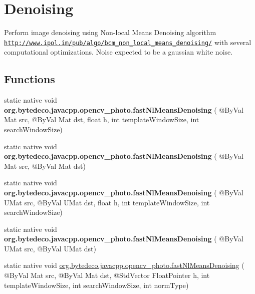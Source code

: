 \hypertarget{group__photo__denoise}{}\section{Denoising}
\label{group__photo__denoise}


Perform image denoising using Non-\/local Means Denoising algorithm \href{http://www.ipol.im/pub/algo/bcm_non_local_means_denoising/}{\tt http\+://www.\+ipol.\+im/pub/algo/bcm\+\_\+non\+\_\+local\+\_\+means\+\_\+denoising/} with several computational optimizations. Noise expected to be a gaussian white noise.  


\subsection*{Functions}
\begin{DoxyCompactItemize}
\item 
\mbox{\label{group__photo__denoise_ga088a2a8638cdda9ef6f168844c3b25af}} 
static native void {\bfseries org.\+bytedeco.\+javacpp.\+opencv\+\_\+photo.\+fast\+Nl\+Means\+Denoising} ( @By\+Val Mat src, @By\+Val Mat dst, float h, int template\+Window\+Size, int search\+Window\+Size)
\item 
\mbox{\label{group__photo__denoise_ga8fe324a3c7b240ea8b9045ff0f70b366}} 
static native void {\bfseries org.\+bytedeco.\+javacpp.\+opencv\+\_\+photo.\+fast\+Nl\+Means\+Denoising} ( @By\+Val Mat src, @By\+Val Mat dst)
\item 
\mbox{\label{group__photo__denoise_ga8f76d1bbd6258fcb1592787b027e955f}} 
static native void {\bfseries org.\+bytedeco.\+javacpp.\+opencv\+\_\+photo.\+fast\+Nl\+Means\+Denoising} ( @By\+Val U\+Mat src, @By\+Val U\+Mat dst, float h, int template\+Window\+Size, int search\+Window\+Size)
\item 
\mbox{\label{group__photo__denoise_gaeacbd5ae21f584ecd99dacb4c6e89d30}} 
static native void {\bfseries org.\+bytedeco.\+javacpp.\+opencv\+\_\+photo.\+fast\+Nl\+Means\+Denoising} ( @By\+Val U\+Mat src, @By\+Val U\+Mat dst)
\item 
static native void \hyperlink{group__photo__denoise_gac9dd83e0192eaed8ea6aad42f98b138b}{org.\+bytedeco.\+javacpp.\+opencv\+\_\+photo.\+fast\+Nl\+Means\+Denoising} ( @By\+Val Mat src, @By\+Val Mat dst, @Std\+Vector Float\+Pointer h, int template\+Window\+Size, int search\+Window\+Size, int norm\+Type)

\end{DoxyCompactItemize}
